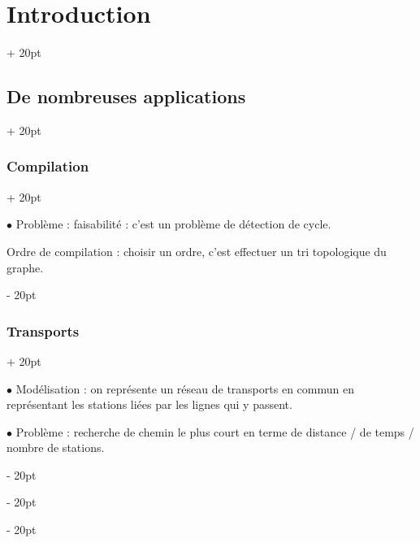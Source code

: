 \documentclass[a4paper, 12pt, twoside]{article}
\newcommand{\ind}[1][20pt]{\advance\leftskip + #1}
\newcommand{\deind}[1][20pt]{\advance\leftskip - #1}
\newenvironment{indt}[2][20pt]{#2 \par \ind[#1]}{\par \deind} %
\begin{document}
\begin{indt}{\section{Introduction}}
\begin{indt}{\subsection{De nombreuses applications}}
\begin{indt}{\subsubsection{Compilation}}
                \begin{center}
                \end{center}

                $\bullet$ Problème : faisabilité : c'est un problème de détection de cycle.

                Ordre de compilation : choisir un ordre, c'est effectuer un tri topologique du graphe.
            \end{indt}

            \vspace{12pt}
            
            \begin{indt}{\subsubsection{Transports}}
                \label{1.2.2}
                
                $\bullet$ Modélisation : on représente un réseau de transports en commun en représentant les stations liées par les lignes qui y passent.

                $\bullet$ Problème : recherche de chemin le plus court en terme de distance / de temps / nombre de stations.
            \end{indt}


\end{indt}
\end{indt}
\end{document}
